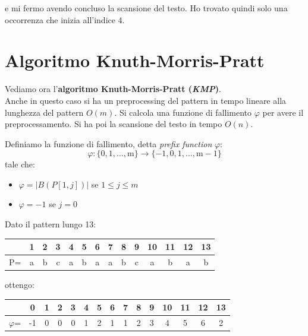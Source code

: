 \documentclass[a4paper,12pt, oneside]{book}
\begin{document}
\begin{esempio}
\begin{center}
  \end{center}
  e mi fermo avendo concluso la scansione del testo. Ho trovato quindi solo una
  occorrenza che inizia all'indice 4.
\end{esempio}
\section{Algoritmo Knuth-Morris-Pratt}
Vediamo ora l'\textbf{algoritmo Knuth-Morris-Pratt (\textit{KMP})}.\\
Anche in questo caso si ha un preprocessing del pattern in tempo lineare alla
lunghezza del pattern $O(m)$. Si calcola una funzione di fallimento $\varphi$
per avere il preprocessamento. Si ha poi la scansione del testo in tempo $O(n)$.
\begin{definizione}
  Definiamo la funzione di fallimento, detta \textit{prefix function}
  $\varphi$: 
  \[\varphi:\{0,1, \ldots, \mathrm{m}\} \rightarrow\{-1,0,1, \ldots,
    \mathrm{m}-1\}\]
  tale che:
  \begin{itemize}
    \item $\varphi=|B(P[1,j])|$ se $1\leq j\leq m$
    \item $\varphi=-1$ se $j=0$
  \end{itemize}
\end{definizione}
\begin{esempio}
  Dato il pattern lungo 13:
  \begin{table}[H]
    \centering
    \begin{tabular}{c||c|c|c|c|c|c|c|c|c|c|c|c|c}
      \hline
      & 1 & 2 & 3 & 4 & 5 & 6 & 7 & 8 & 9 & 10 & 11 & 12 & 13 \\
      \hline
      P=&a& b & c& a& b& a &a &b &c &a&b&a&b\\
      \hline
    \end{tabular}
  \end{table}
  ottengo:
   \begin{table}[H]
    \centering
    \begin{tabular}{c||c|c|c|c|c|c|c|c|c|c|c|c|c|c}
      \hline
      &0 & 1 & 2 & 3 & 4 & 5 & 6 & 7 & 8 & 9 & 10 & 11 & 12 & 13 \\
      \hline
      $\varphi$=&-1& 0 & 0& 0& 1 &2 &1 &1 &2&3&4&5&6&2\\
      \hline
    \end{tabular}
  \end{table}
\end{esempio}
\end{document}
